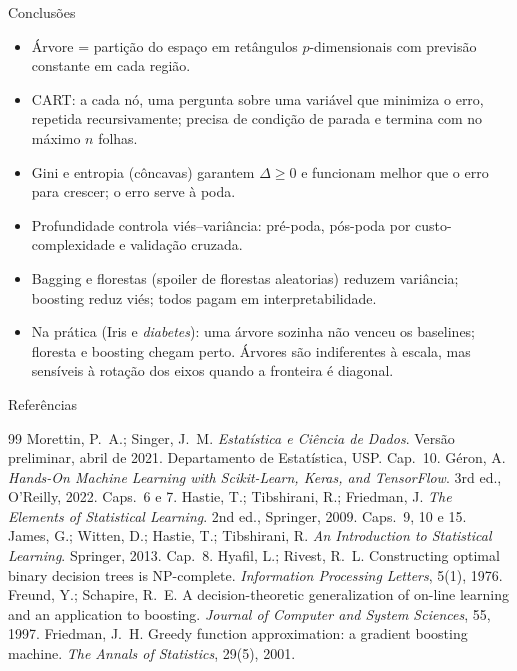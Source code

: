 \documentclass[aspectratio=169]{beamer}
\begin{document}
\begin{frame}{Conclusões}
\begin{itemize}
  \item Árvore = partição do espaço em retângulos $p$-dimensionais com previsão constante em cada região.
  \item CART: a cada nó, uma pergunta sobre uma variável que minimiza o erro, repetida recursivamente; precisa de condição de parada e termina com no máximo $n$ folhas.
  \item Gini e entropia (côncavas) garantem $\Delta\ge0$ e funcionam melhor que o erro para \alert{crescer}; o erro serve à \alert{poda}.
  \item Profundidade controla viés--variância: pré-poda, pós-poda por custo-complexidade e validação cruzada.
  \item Bagging e florestas (spoiler de florestas aleatorias) reduzem variância; boosting reduz viés; todos pagam em interpretabilidade.
  \item Na prática (Iris e \emph{diabetes}): uma árvore sozinha não venceu os baselines; floresta e boosting chegam perto. Árvores são \alert{indiferentes à escala}, mas \alert{sensíveis à rotação} dos eixos quando a fronteira é diagonal.
\end{itemize}
\end{frame}

\begin{frame}[allowframebreaks]{Referências}
\footnotesize
\begin{thebibliography}{99}
 Morettin, P.\ A.; Singer, J.\ M. \textit{Estatística e Ciência de Dados}. Versão preliminar, abril de 2021. Departamento de Estatística, USP. Cap.~10.
 Géron, A. \textit{Hands-On Machine Learning with Scikit-Learn, Keras, and TensorFlow}. 3rd ed., O'Reilly, 2022. Caps.~6 e 7.
 Hastie, T.; Tibshirani, R.; Friedman, J. \textit{The Elements of Statistical Learning}. 2nd ed., Springer, 2009. Caps.~9, 10 e 15.
 James, G.; Witten, D.; Hastie, T.; Tibshirani, R. \textit{An Introduction to Statistical Learning}. Springer, 2013. Cap.~8.
 Hyafil, L.; Rivest, R.\ L. Constructing optimal binary decision trees is NP-complete. \textit{Information Processing Letters}, 5(1), 1976.
 Freund, Y.; Schapire, R.\ E. A decision-theoretic generalization of on-line learning and an application to boosting. \textit{Journal of Computer and System Sciences}, 55, 1997.
 Friedman, J.\ H. Greedy function approximation: a gradient boosting machine. \textit{The Annals of Statistics}, 29(5), 2001.
\end{thebibliography}
\end{frame}
\end{document}
